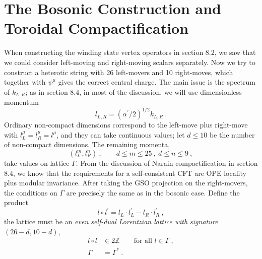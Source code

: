 \section{The Bosonic Construction and Toroidal Compactification} \label{sec:11.6}

When constructing the winding state vertex operators in section 8.2, we saw that we could consider left-moving and right-moving scalars separately. Now we try to construct a heterotic string with 26 left-movers and 10 right-moves, which together with $\psi^{\mu}$ gives the correct central charge. The main issue is the spectrum of $k_{L,R}$; as in section 8.4, in most of the discussion, we will use dimensionless momentum
\begin{equation}
	l_{L,R} = (\alpha^{\prime}/2)^{1/2} k_{L,R} \:. \label{11.6.1}
\end{equation}
Ordinary non-compact dimensions correspond to the left-move plus right-move with $l_{L}^{\mu}=l_{R}^{\mu}=l^{\mu}$, and they can take continuous values; let $d\leq 10$ be the number of non-compact dimensions. The remaining momenta,
\begin{equation}
	(l_{L}^{m},l_{R}^{n}) \:, \qquad d\leq m \leq 25 \:, \: d\leq n \leq 9 \:, \label{11.6.2}
\end{equation}
take values on lattice $\Gamma$. From the discussion of Narain compactification in section 8.4, we know that the requirements for a self-consistent CFT are OPE locality plus modular invariance. After taking the GSO projection on the right-movers, the conditions on $\Gamma$ are precisely the same as in the bosonic case. Define the product
\begin{equation}
	l \circ l^{\prime} = l_{L}\cdot l_{L}^{\prime} - l_{R} \cdot l_{R}^{\prime} \:, \label{11.6.3}
\end{equation}
the lattice must be an \emph{even self-dual Lorentzian lattice with signature $(26-d,10-d)$},
\begin{subequations}
	\begin{align}
		l \circ l & \in 2\mathds{Z} \qquad \text{for all } l\in\Gamma \:, \label{11.6.4a} \\
		\Gamma &= \Gamma^{\ast} \:. \label{11.6.4b}
	\end{align} \label{11.6.4}
\end{subequations}

